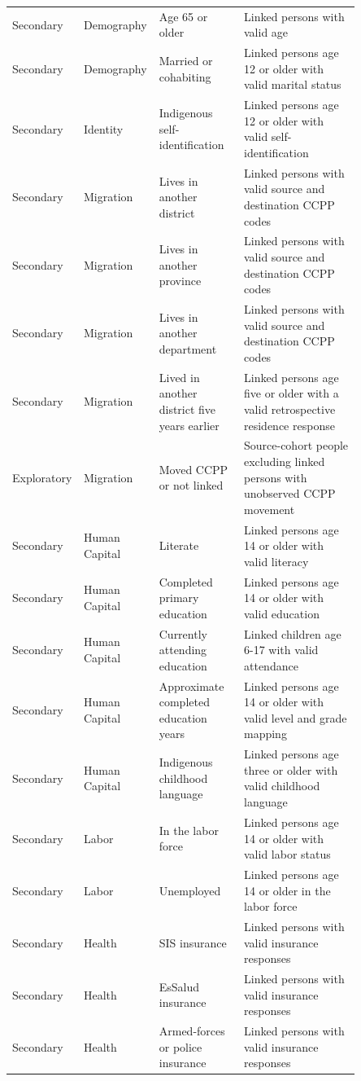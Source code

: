 \begin{longtable}{p{0.10\linewidth}p{0.18\linewidth}p{0.24\linewidth}p{0.33\linewidth}}
Secondary & Demography & Age 65 or older & Linked persons with valid age \\
Secondary & Demography & Married or cohabiting & Linked persons age 12 or older with valid marital status \\
Secondary & Identity & Indigenous self-identification & Linked persons age 12 or older with valid self-identification \\
Secondary & Migration & Lives in another district & Linked persons with valid source and destination CCPP codes \\
Secondary & Migration & Lives in another province & Linked persons with valid source and destination CCPP codes \\
Secondary & Migration & Lives in another department & Linked persons with valid source and destination CCPP codes \\
Secondary & Migration & Lived in another district five years earlier & Linked persons age five or older with a valid retrospective residence response \\
Exploratory & Migration & Moved CCPP or not linked & Source-cohort people excluding linked persons with unobserved CCPP movement \\
Secondary & Human Capital & Literate & Linked persons age 14 or older with valid literacy \\
Secondary & Human Capital & Completed primary education & Linked persons age 14 or older with valid education \\
Secondary & Human Capital & Currently attending education & Linked children age 6-17 with valid attendance \\
Secondary & Human Capital & Approximate completed education years & Linked persons age 14 or older with valid level and grade mapping \\
Secondary & Human Capital & Indigenous childhood language & Linked persons age three or older with valid childhood language \\
Secondary & Labor & In the labor force & Linked persons age 14 or older with valid labor status \\
Secondary & Labor & Unemployed & Linked persons age 14 or older in the labor force \\
Secondary & Health & SIS insurance & Linked persons with valid insurance responses \\
Secondary & Health & EsSalud insurance & Linked persons with valid insurance responses \\
Secondary & Health & Armed-forces or police insurance & Linked persons with valid insurance responses \\

\end{longtable}

